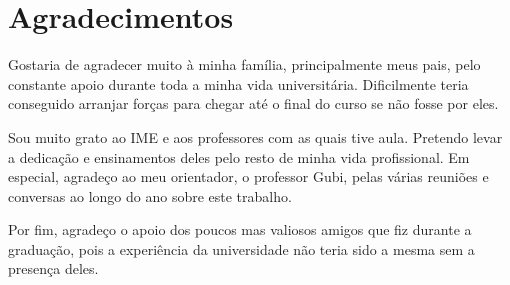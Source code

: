 \chapter*{Agradecimentos}

Gostaria de agradecer muito à minha família, principalmente meus pais, pelo constante apoio durante toda a minha vida universitária. Dificilmente teria conseguido arranjar forças para chegar até o final do curso se não fosse por eles.

Sou muito grato ao IME e aos professores com as quais tive aula. Pretendo levar a dedicação e ensinamentos deles pelo resto de minha vida profissional. Em especial, agradeço ao meu orientador, o professor Gubi, pelas várias reuniões e conversas ao longo do ano sobre este trabalho.

Por fim, agradeço o apoio dos poucos mas valiosos amigos que fiz durante a graduação, pois a experiência da universidade não teria sido a mesma sem a presença deles.

